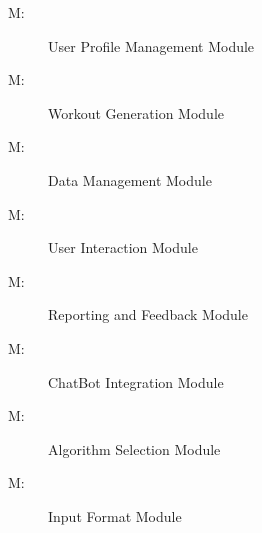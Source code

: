 \documentclass[12pt, titlepage]{article}
\newcounter{mnum}
\newcommand{\mthemnum}{M\themnum}
\begin{document}
\begin{description}
\item [ \mthemnum \label{mUP}:] User Profile Management Module
\item [ \mthemnum \label{mWG}:] Workout Generation Module
\item [ \mthemnum \label{mDM}:] Data Management Module
\item [ \mthemnum \label{mUI}:] User Interaction Module
\item [ \mthemnum \label{mRF}:] Reporting and Feedback Module
\item [ \mthemnum \label{mCI}:] ChatBot Integration Module
\item [ \mthemnum \label{mAS}:] Algorithm Selection Module
\item [ \mthemnum \label{mIF}:] Input Format Module
\end{description}
\end{document}
